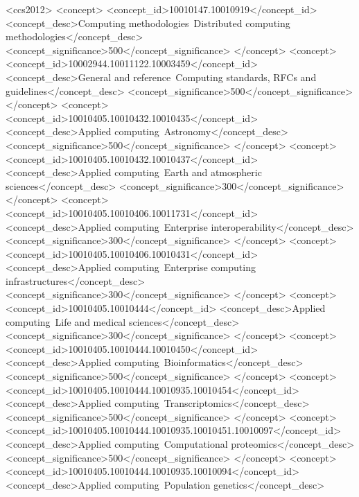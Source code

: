 \documentclass[sigconf,revew,screen,timestamp,nonacm]{acmart}
\begin{document}
\begin{CCSXML}
<ccs2012>
   <concept>
       <concept_id>10010147.10010919</concept_id>
       <concept_desc>Computing methodologies~Distributed computing methodologies</concept_desc>
       <concept_significance>500</concept_significance>
       </concept>
   <concept>
       <concept_id>10002944.10011122.10003459</concept_id>
       <concept_desc>General and reference~Computing standards, RFCs and guidelines</concept_desc>
       <concept_significance>500</concept_significance>
       </concept>
   <concept>
       <concept_id>10010405.10010432.10010435</concept_id>
       <concept_desc>Applied computing~Astronomy</concept_desc>
       <concept_significance>500</concept_significance>
       </concept>
   <concept>
       <concept_id>10010405.10010432.10010437</concept_id>
       <concept_desc>Applied computing~Earth and atmospheric sciences</concept_desc>
       <concept_significance>300</concept_significance>
       </concept>
   <concept>
       <concept_id>10010405.10010406.10011731</concept_id>
       <concept_desc>Applied computing~Enterprise interoperability</concept_desc>
       <concept_significance>300</concept_significance>
       </concept>
   <concept>
       <concept_id>10010405.10010406.10010431</concept_id>
       <concept_desc>Applied computing~Enterprise computing infrastructures</concept_desc>
       <concept_significance>300</concept_significance>
       </concept>
   <concept>
       <concept_id>10010405.10010444</concept_id>
       <concept_desc>Applied computing~Life and medical sciences</concept_desc>
       <concept_significance>300</concept_significance>
       </concept>
   <concept>
       <concept_id>10010405.10010444.10010450</concept_id>
       <concept_desc>Applied computing~Bioinformatics</concept_desc>
       <concept_significance>500</concept_significance>
       </concept>
   <concept>
       <concept_id>10010405.10010444.10010935.10010454</concept_id>
       <concept_desc>Applied computing~Transcriptomics</concept_desc>
       <concept_significance>500</concept_significance>
       </concept>
   <concept>
       <concept_id>10010405.10010444.10010935.10010451.10010097</concept_id>
       <concept_desc>Applied computing~Computational proteomics</concept_desc>
       <concept_significance>500</concept_significance>
       </concept>
   <concept>
       <concept_id>10010405.10010444.10010935.10010094</concept_id>
       <concept_desc>Applied computing~Population genetics</concept_desc>

\end{CCSXML}
\end{document}
